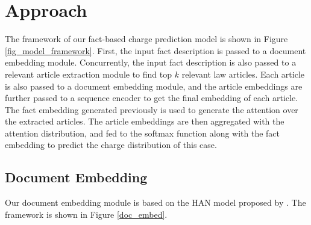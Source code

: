 \section{Approach}
The framework of our fact-based charge prediction model is shown in Figure \ref{fig_model_framework}. First, the input fact description is passed to a document embedding module. Concurrently, the input fact description is also passed to a relevant article extraction module to find top $k$ relevant law articles. Each article is also passed to a document embedding module, and the article embeddings are further passed to a sequence encoder to get the final embedding of each article. The fact embedding generated previously is used to generate the attention over the extracted articles. The article embeddings are then aggregated with the attention distribution, and fed to the softmax function along with the fact embedding to predict the charge distribution of this case.


\subsection{Document Embedding}
Our document embedding module is based on the HAN model proposed by \cite{yang2016hierarchical}. The framework is shown in Figure \ref{doc_embed}.

